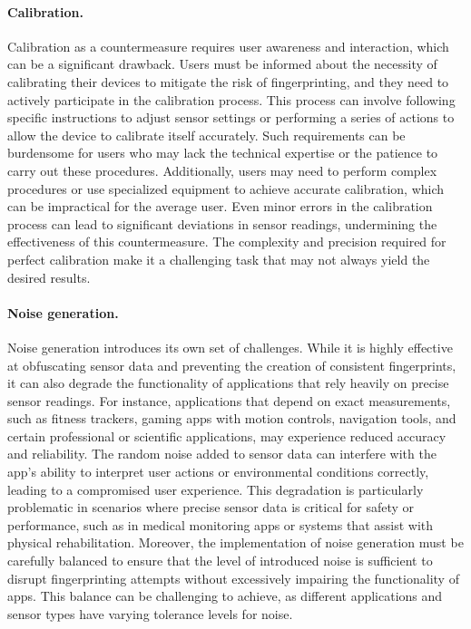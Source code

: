 \documentclass[11pt,
  oneside,openany,    %
]{scrreprt}
\begin{document}
\paragraph{Calibration.}
\label{par:calibration_disadvantage}
Calibration as a countermeasure requires user awareness and interaction, which can be a significant drawback. 
Users must be informed about the necessity of calibrating their devices to mitigate the risk of fingerprinting, and they need to actively participate in the calibration process. 
This process can involve following specific instructions to adjust sensor settings or performing a series of actions to allow the device to calibrate itself accurately. 
Such requirements can be burdensome for users who may lack the technical expertise or the patience to carry out these procedures. 
Additionally, users may need to perform complex procedures or use specialized equipment to achieve accurate calibration, which can be impractical for the average user. 
Even minor errors in the calibration process can lead to significant deviations in sensor readings, undermining the effectiveness of this countermeasure. 
The complexity and precision required for perfect calibration make it a challenging task that may not always yield the desired results.

\paragraph{Noise generation.}
\label{par:noise_disadvantage}
Noise generation introduces its own set of challenges. 
While it is highly effective at obfuscating sensor data and preventing the creation of consistent fingerprints, it can also degrade the functionality of applications that rely heavily on precise sensor readings. 
For instance, applications that depend on exact measurements, such as fitness trackers, gaming apps with motion controls, navigation tools, and certain professional or scientific applications, may experience reduced accuracy and reliability. 
The random noise added to sensor data can interfere with the app's ability to interpret user actions or environmental conditions correctly, leading to a compromised user experience. 
This degradation is particularly problematic in scenarios where precise sensor data is critical for safety or performance, such as in medical monitoring apps or systems that assist with physical rehabilitation.
Moreover, the implementation of noise generation must be carefully balanced to ensure that the level of introduced noise is sufficient to disrupt fingerprinting attempts without excessively impairing the functionality of apps. 
This balance can be challenging to achieve, as different applications and sensor types have varying tolerance levels for noise.
\end{document}
